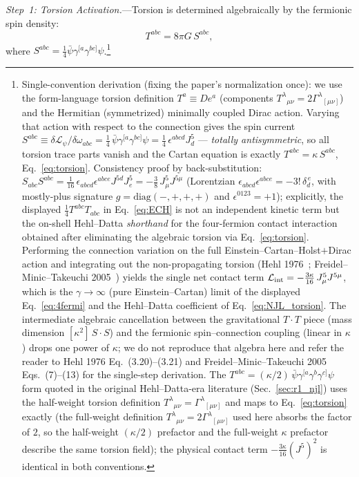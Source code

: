 \documentclass[aps,prd,twocolumn,superscriptaddress,showpacs,preprintnumbers,nofootinbib,longbibliography,floatfix]{revtex4-2}
\begin{document}
\textit{Step~1: Torsion Activation.}---Torsion is determined algebraically by the
fermionic spin density:
\begin{equation}\label{eq:torsion}
T^{abc} = 8\pi G\, S^{abc},
\end{equation}
where $S^{abc} = \frac{1}{4}\bar{\psi}\gamma^{[a}\gamma^{bc]}\psi$.\footnote{Single-convention
derivation (fixing the paper's normalization once): we use the
form-language torsion definition $T^a \equiv De^a$ (components
$T^\lambda{}_{\mu\nu} = 2\Gamma^\lambda{}_{[\mu\nu]}$) and the Hermitian
(symmetrized) minimally coupled Dirac action. Varying that action with
respect to the connection gives the spin current
$S^{abc} \equiv \delta\mathcal{L}_\psi/\delta\omega_{abc}
= \tfrac{1}{4}\,\bar\psi\gamma^{[a}\gamma^{bc]}\psi
= \tfrac{1}{4}\,\epsilon^{abcd} J^5_d$ --- \emph{totally antisymmetric},
so all torsion trace parts vanish and the Cartan equation is exactly
$T^{abc} = \kappa\,S^{abc}$, Eq.~\eqref{eq:torsion}. Consistency proof by
back-substitution: $S_{abc}S^{abc} = \tfrac{1}{16}\,
\epsilon_{abcd}\epsilon^{abce} J^{5d}J^5_e = -\tfrac{3}{8}\,J^5_\mu
J^{5\mu}$ (Lorentzian $\epsilon_{abcd}\epsilon^{abce} = -3!\,
\delta_d^{\,e}$, with mostly-plus signature
$g=\mathrm{diag}(-,+,+,+)$ and $\epsilon^{0123}=+1$); explicitly,
the displayed $\tfrac{1}{4}T^{abc}T_{abc}$ in Eq.~\eqref{eq:ECH} is
not an independent kinetic term but the on-shell Hehl--Datta
\emph{shorthand} for the four-fermion contact interaction obtained
after eliminating the algebraic torsion via Eq.~\eqref{eq:torsion}.
Performing the connection variation on the full
Einstein--Cartan--Holst$+$Dirac action and integrating out the
non-propagating torsion (Hehl 1976~\cite{Hehl1976};
Freidel--Minic--Takeuchi 2005~\cite{Freidel2005}) yields the
single net contact term
$\mathcal{L}_{\rm int} = -\tfrac{3\kappa}{16}\,J^5_\mu J^{5\mu}$,
which is the $\gamma\!\to\!\infty$ (pure Einstein--Cartan) limit of
the displayed Eq.~\eqref{eq:4fermi} and the Hehl--Datta coefficient
of Eq.~\eqref{eq:NJL_torsion}. The intermediate algebraic
cancellation between the gravitational $T\cdot T$ piece (mass
dimension $[\kappa^2]\,S\cdot S$) and the fermionic
spin--connection coupling (linear in $\kappa$) drops one power of
$\kappa$; we do not reproduce that algebra here and refer the
reader to Hehl 1976 Eq.~(3.20)--(3.21) and
Freidel--Minic--Takeuchi 2005 Eqs.~(7)--(13) for the
single-step derivation.
The $T^{abc} = (\kappa/2)\,\bar\psi\gamma^{[a}\gamma^b\gamma^{c]}\psi$
form quoted in the original Hehl--Datta-era literature
(Sec.~\ref{sec:r1_njl}) uses the half-weight torsion definition
$T^\lambda{}_{\mu\nu} = \Gamma^\lambda{}_{[\mu\nu]}$ and maps to
Eq.~\eqref{eq:torsion} exactly (the full-weight definition
$T^\lambda{}_{\mu\nu} = 2\Gamma^\lambda{}_{[\mu\nu]}$ used here
absorbs the factor of $2$, so the half-weight $(\kappa/2)$
prefactor and the full-weight $\kappa$ prefactor describe the same
torsion field); the physical contact term
$-\tfrac{3\kappa}{16}(J^5)^2$ is identical in both conventions.}
\end{document}
